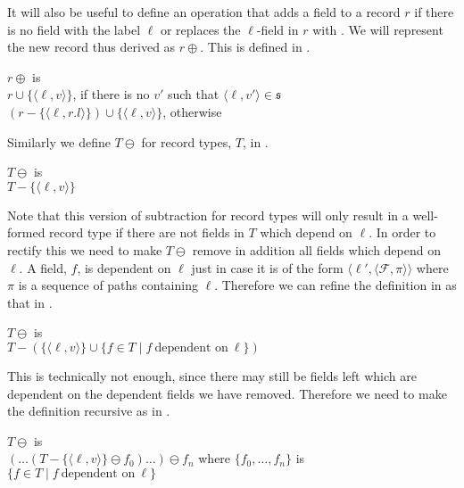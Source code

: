 It will also be useful to define an operation that adds a field
 to a record $r$ if there is no field
with the label $\ell$ or replaces the $\ell$-field in $r$ with
.  We will represent the new record
thus derived as $r\oplus$.  This
is defined in \nexteg{}.
\begin{ex} 
$r\oplus$ is \\
\hspace*{1em}$r\cup\{\langle\ell,v\rangle\}$, if there is no $v'$ such
that $\langle\ell,v'\rangle\in\mathfrak{s}$\\
\hspace*{1em}$(r-\{\langle\ell,r.l\rangle\})\cup\{\langle\ell,v\rangle\}$, otherwise 
\end{ex} 
Similarly we define $T\ominus$
for record types, $T$, in
\nexteg{}.
\begin{ex} 
$T\ominus$ is \\ 
\hspace*{1em}$T-\{\langle\ell,v\rangle\}$ 
\end{ex} 
Note that this version of subtraction for record types will only
result in a well-formed record type if there are not fields in $T$
which depend on $\ell$.  In order to rectify this we need to make
$T\ominus$ remove in addition
all fields which depend on $\ell$.  A field, $f$, is dependent on $\ell$
just in case it is of the form
$\langle\ell',\langle\mathcal{F},\pi\rangle\rangle$ where $\pi$ is a
sequence of paths containing $\ell$. Therefore we can refine the
definition in \preveg{} as that in \nexteg{}.
\begin{ex} 
$T\ominus$ is \\ 
\hspace*{1em}$T-(\{\langle\ell,v\rangle\}\cup\{f\in T\mid f\
\text{dependent on}\ \ell\})$ 
\end{ex} 
This is technically not enough, since there may still be fields left
which are dependent on the dependent fields we have removed.
Therefore we need to make the definition recursive as in \nexteg{}.
\begin{ex} 
$T\ominus$ is \\ 
\hspace*{1em}$(\ldots(T-\{\langle\ell,v\rangle\}\ominus
f_0)\ldots)\ominus f_n$ where $\{f_0,\ldots,f_n\}$ is $\{f\in T\mid f\
\text{dependent on}\ \ell\}$ 
\end{ex}   


